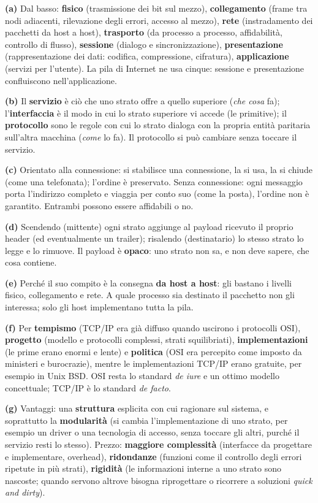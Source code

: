 \svolgimento
\textbf{(a)} Dal basso: \textbf{fisico} (trasmissione dei bit sul mezzo), \textbf{collegamento} (frame tra nodi adiacenti, rilevazione
degli errori, accesso al mezzo), \textbf{rete} (instradamento dei pacchetti da host a host), \textbf{trasporto} (da processo a processo,
affidabilità, controllo di flusso), \textbf{sessione} (dialogo e sincronizzazione), \textbf{presentazione} (rappresentazione dei dati:
codifica, compressione, cifratura), \textbf{applicazione} (servizi per l'utente). La pila di Internet ne usa cinque: sessione e
presentazione confluiscono nell'applicazione.

\textbf{(b)} Il \textbf{servizio} è ciò che uno strato offre a quello superiore (\emph{che cosa} fa); l'\textbf{interfaccia} è il modo in cui
lo strato superiore vi accede (le primitive); il \textbf{protocollo} sono le regole con cui lo strato dialoga con la propria entità paritaria
sull'altra macchina (\emph{come} lo fa). Il protocollo si può cambiare senza toccare il servizio.

\textbf{(c)} Orientato alla connessione: si stabilisce una connessione, la si usa, la si chiude (come una telefonata); l'ordine è
preservato. Senza connessione: ogni messaggio porta l'indirizzo completo e viaggia per conto suo (come la posta), l'ordine non è
garantito. Entrambi possono essere affidabili o no.

\textbf{(d)} Scendendo (mittente) ogni strato aggiunge al payload ricevuto il proprio header (ed eventualmente un trailer); risalendo
(destinatario) lo stesso strato lo legge e lo rimuove. Il payload è \textbf{opaco}: uno strato non sa, e non deve sapere, che cosa contiene.

\textbf{(e)} Perché il suo compito è la consegna \textbf{da host a host}: gli bastano i livelli fisico, collegamento e rete. A quale processo
sia destinato il pacchetto non gli interessa; solo gli host implementano tutta la pila.

\textbf{(f)} Per \textbf{tempismo} (TCP/IP era già diffuso quando uscirono i protocolli OSI), \textbf{progetto} (modello e protocolli
complessi, strati squilibriati), \textbf{implementazioni} (le prime erano enormi e lente) e \textbf{politica} (OSI era percepito come
imposto da ministeri e burocrazie), mentre le implementazioni TCP/IP erano gratuite, per esempio in Unix BSD. OSI resta lo standard
\emph{de iure} e un ottimo modello concettuale; TCP/IP è lo standard \emph{de facto}.

\textbf{(g)} Vantaggi: una \textbf{struttura} esplicita con cui ragionare sul sistema, e soprattutto la \textbf{modularità} (si cambia
l'implementazione di uno strato, per esempio un driver o una tecnologia di accesso, senza toccare gli altri, purché il servizio resti
lo stesso). Prezzo: \textbf{maggiore complessità} (interfacce da progettare e implementare, overhead), \textbf{ridondanze} (funzioni come
il controllo degli errori ripetute in più strati), \textbf{rigidità} (le informazioni interne a uno strato sono nascoste; quando servono
altrove bisogna riprogettare o ricorrere a soluzioni \emph{quick and dirty}).


